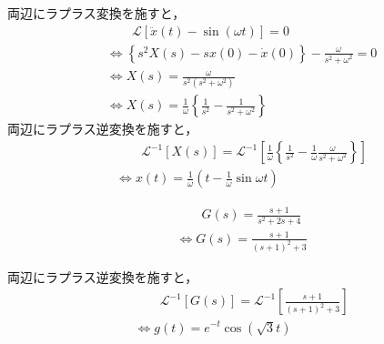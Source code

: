 \documentclass[a4paper,12pt]{article}
\begin{document}
\begin{tcolorbox}[title={2.\quad \(\ddot{x}(t) - \sin(\omega t) = 0\) を解け。ただし、初期値はすべて０とする。
    }]
    \quad 両辺にラプラス変換を施すと，
    \vspace{-3mm}
    \begin{align*}
        &\qquad \mathcal{L}\left[ \ddot{x}(t) - \sin(\omega t) \right] 
        = 0 \\
        &\Leftrightarrow \left\{ s^2 X(s) - sx(0) - \dot{x}(0) \right\}
        - \frac{\omega}{s^2 + \omega^2}
        = 0  \\
        &\Leftrightarrow X(s) = \frac{\omega}{s^2(s^2 + \omega^2)}  \\
        &\Leftrightarrow X(s) = \frac{1}{\omega}\left\{\frac{1}{s^2} - \frac{1}{s^2 + \omega^2} \right\} 
    \end{align*}
    \vspace{-4mm}
    \quad 両辺にラプラス逆変換を施すと，
    \begin{align*}
    &\qquad \mathcal{L}^{-1} \left[ X(s) \right] 
    = \mathcal{L}^{-1} \left[ \frac{1}{\omega}\left\{\frac{1}{s^2} - \frac{1}{\omega} \frac{\omega}{s^2 + \omega^2} \right\}  \right] \\
    &\Leftrightarrow x(t) = \frac{1}{\omega} \left( t - \frac{1}{\omega} \sin \omega t \right)
    \end{align*}

\end{tcolorbox}

\begin{tcolorbox}[title={3. 伝達関数\(\dfrac{s+1}{s^2+2s+4}\)のラプラス逆変換を行え。
    }]
    \vspace{-5mm}
\begin{align*}
    &\qquad G(s) =\frac{s+1}{s^2+2s+4}  \\
    &\Leftrightarrow G(s) =\frac{s + 1}{ ( s + 1 )^2+ 3} 
\end{align*}

\quad 両辺にラプラス逆変換を施すと，
\vspace{-3mm}
\begin{align*}
    &\qquad \mathcal{L}^{-1} \left[ G(s) \right] 
    =\mathcal{L}^{-1} \left[ \frac{s + 1}{ ( s + 1 )^2+ 3}  \right] \\
    &\Leftrightarrow g(t) = e^{-t} \cos (\sqrt{3} t)   
\end{align*}

\end{tcolorbox}
\end{document}
